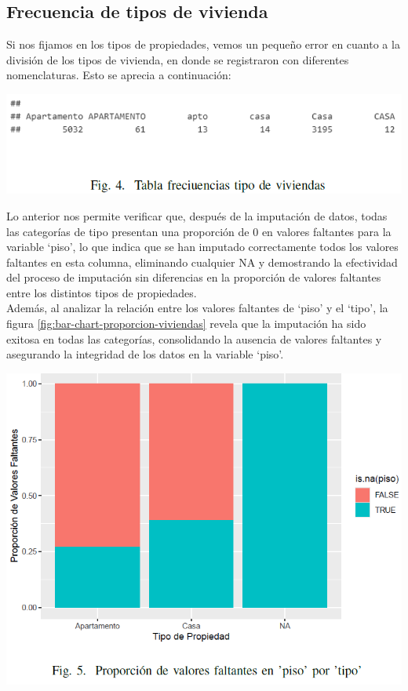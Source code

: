 \documentclass[conference,final,]{IEEEtran}
\begin{document}
\subsection{\textbf{Frecuencia de tipos de vivienda}}

Si nos fijamos en los tipos de propiedades, vemos un pequeño error en
cuanto a la división de los tipos de vivienda, en donde se registraron
con diferentes nomenclaturas. Esto se aprecia a continuación:\\

\begin{flushleft}\includegraphics[width=1\linewidth]{images/FrecuenciaTiposViviendas} \end{flushleft}

\hfill\break
Lo anterior nos permite verificar que, después de la imputación de
datos, todas las categorías de tipo presentan una proporción de 0 en
valores faltantes para la variable `piso', lo que indica que se han
imputado correctamente todos los valores faltantes en esta columna,
eliminando cualquier NA y demostrando la efectividad del proceso de
imputación sin diferencias en la proporción de valores faltantes entre
los distintos tipos de propiedades.\\

Además, al analizar la relación entre los valores faltantes de `piso' y
el `tipo', la figura \ref{fig:bar-chart-proporcion-viviendas} revela que
la imputación ha sido exitosa en todas las categorías, consolidando la
ausencia de valores faltantes y asegurando la integridad de los datos en
la variable `piso'.

\begin{center}\includegraphics[width=1\linewidth]{images/ProporcionFaltantesPisoTipo} \end{center}
\end{document}
